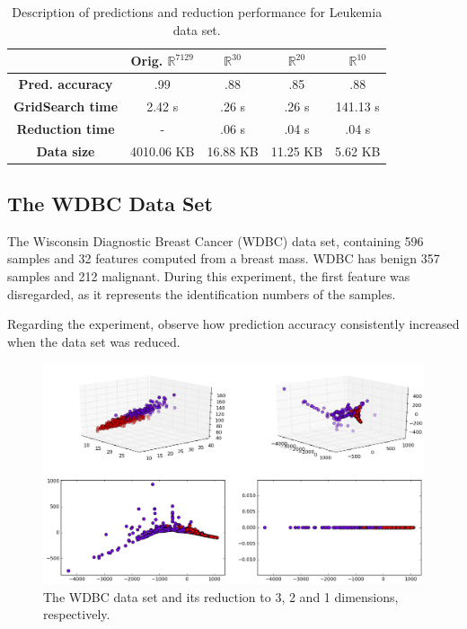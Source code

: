 \begin{table}[H]
	\centering
	\begin{tabular}{|c|c|c|c|c|}
		\hline
		& \textbf{Orig. $\mathbb{R}^{7129}$} & \textbf{$\mathbb{R}^{30}$} & \textbf{$\mathbb{R}^{20}$} & \textbf{$\mathbb{R}^{10}$} \\\hline
		\textbf{Pred. accuracy}    & .99 & .88 & .85 & .88 \\\hline
		\textbf{GridSearch time}   & 2.42 s & .26 s & .26 s & 141.13 s \\\hline
		\textbf{Reduction time}    & - & .06 s & .04 s & .04 s \\\hline
		\textbf{Data size}         & 4010.06 KB & 16.88 KB & 11.25 KB & 5.62 KB \\\hline
	\end{tabular}
	\captionsetup{justification=centering}
	\caption{Description of predictions and reduction performance for Leukemia data set.}
\end{table}

\subsection{The WDBC Data Set}

The Wisconsin Diagnostic Breast Cancer (WDBC) data set, containing 596 samples and 32 features computed from a breast mass. WDBC has benign 357 samples and 212 malignant. During this experiment, the first feature was disregarded, as it represents the identification numbers of the samples.

Regarding the experiment, observe how prediction accuracy consistently increased when the data set was reduced.

\begin{figure}[H]
	\centering
	\includegraphics[width=.9\linewidth]{img/experiments/iso_wdbc}
	\captionsetup{justification=centering}
	\caption{The WDBC data set and its reduction to 3, 2 and 1 dimensions, respectively.}
	\label{fig:iso_wdbc}
\end{figure}

